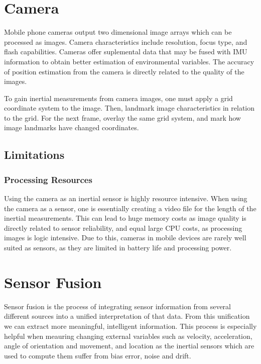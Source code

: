 \documentclass{acm_proc_article-sp}
\begin{document}
\section{Camera}

Mobile phone cameras output two dimensional image arrays which can be processed as images.\cite{sencam}  Camera characteristics include resolution, focus type, and flash capabilities.  Cameras offer suplemental data that may be fused with IMU information to obtain 
better estimation of environmental variables.  The accuracy of position estimation from the camera is directly related to the quality of the images.\cite{alves2003camera}

To gain inertial measurements from camera images, one must apply a grid coordinate system to the image.  Then, landmark image characteristics in relation to the grid.  For the next frame, overlay the same grid system, and mark how image landmarks have changed coordinates.\cite{sencam}

\subsection{Limitations}
\subsubsection{Processing Resources}
Using the camera as an inertial sensor is highly resource intensive.  When using the camera as a sensor, one is essentially creating a video file for the length of the inertial measurements.  This can lead to huge memory costs as image quality is directly related to sensor reliability, and equal large CPU costs, as processing images is logic intensive.  Due to this, cameras in mobile devices are rarely well suited as sensors, as they are limited in battery life and processing power.\cite{alves2003camera}

\section{Sensor Fusion}

Sensor fusion is the process of integrating sensor information from several different sources into a unified interpretation of that data.
From this unification we can extract more meaningful, intelligent information.\cite{brooks1998multi}  This process is especially helpful when 
meauring changing external variables such as velocity, acceleration, angle of orientation and movement, and location as the inertial sensors
which are used to compute them suffer from bias error, noise and drift.\cite{sencam}\cite{klein2004sensor}
\end{document}
